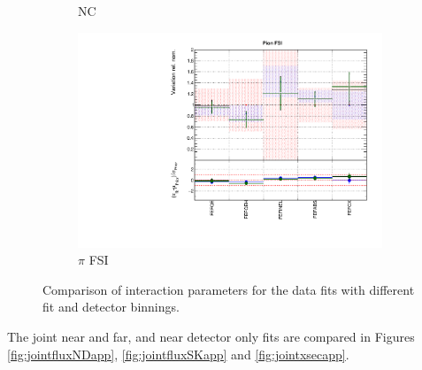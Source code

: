 \begin{figure}[!htbp]
\begin{subfigure}{0.49\textwidth}
  \caption{NC}
\end{subfigure}
\begin{subfigure}{0.49\textwidth}
  \centering
  \includegraphics[width=0.9\linewidth]{figs/polydataxsec_5}
  \caption{$\pi$ FSI}
\end{subfigure}
\caption{Comparison of interaction parameters for the data fits with different fit and detector binnings.}
\label{fig:polydataxsecapp}
\end{figure}

The joint near and far, and near detector only fits are compared in Figures \ref{fig:jointfluxNDapp}, \ref{fig:jointfluxSKapp} and \ref{fig:jointxsecapp}.

